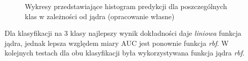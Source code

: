 \documentclass[a4paper, twoside, 11pt, openright]{article}
\begin{document}
\begin{figure}[H]%
\centering
{}%
\qquad
{}%

\caption{Wykresy przedstawiające histogram predykcji dla poszczególnych klas w zależności od jądra (opracowanie własne)}
\label{img:svm_kernel_histograms}
\end{figure}

Dla klasyfikacji na 3 klasy najlepszy wynik dokładności daje \textit{liniowa} funkcja jądra, jednak lepsza względem miary AUC jest ponownie funkcja \textit{rbf}. W kolejnych testach dla obu klasyfikacji była wykorzystywana funkcja jądra \textit{rbf}.
\end{document}
